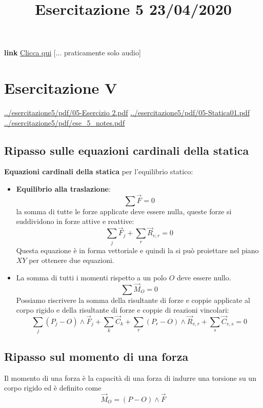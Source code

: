 \title{Esercitazione 5 23/04/2020}\newline
\textbf{link} \href{https://web.microsoftstream.com/video/e80c852f-1851-42f7-9a73-dfb6b8d85ee9}{Clicca qui} [... praticamente solo audio]
\section{Esercitazione V}
\url{../esercitazione5/pdf/05-Esercizio 2.pdf}\newline
\url{../esercitazione5/pdf/05-Statica01.pdf}\newline
\url{../esercitazione5/pdf/ese_5_notes.pdf}
\subsection{Ripasso sulle equazioni cardinali della statica}
\textbf{Equazioni cardinali della statica} per l'equilibrio statico:
\begin{itemize}
    \item \textbf{Equilibrio alla traslazione}:\[
        \sum \vec{F} = 0 
    \]
    la somma di tutte le forze applicate deve essere nulla, queste forze si suddividono in forze attive e reattive:
    \[
        \sum_j \vec{F}_j + \sum_r \vec{R}_{v,r} = 0
    \]
    Questa equazione è in forma vettoriale e quindi la si può proiettare nel piano $XY$ per ottenere due equazioni.
    \item La somma di tutti i momenti rispetto a un polo $O$ deve essere nullo.
    \[
        \sum \vec{M}_O = 0
    \]
    Possiamo riscrivere la somma della risultante di forze e coppie applicate al corpo rigido e della risultante di forze e coppie di reazioni vincolari:
    \[
        \sum_j (P_j - O) \land \vec{F}_j + \sum_k \vec{C}_k + \sum_r (P_r-O) \land \vec{R}_{v,r} + \sum _s \vec{C}_{v,s} = 0
    \]
\end{itemize}
\subsection{Ripasso sul momento di una forza}
Il momento di una forza è la capacità di una forza di indurre una torsione su un corpo rigido ed è definito come
\[
    \vec{M}_O = (P-O) \land \vec{F}
\]
